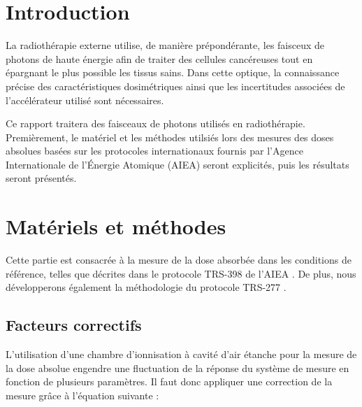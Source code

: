 \documentclass{article}
\begin{document}




\onehalfspacing

\pagestyle{fancy}
	\renewcommand\headrulewidth{0.5pt}
	\renewcommand\footrulewidth{0.5pt}
	\fancyfoot[R]{\thepage}

\tableofcontents
\clearpage
\section{Introduction}

La radiothérapie externe utilise, de manière prépondérante, les faisceux de photons de haute énergie afin de traiter des cellules cancéreuses tout en épargnant le plus possible les tissus sains. Dans cette optique, la connaissance précise des caractéristiques dosimétriques ainsi que les incertitudes associées de l'accélérateur utilisé sont nécessaires. 

Ce rapport traitera des faisceaux de photons utilisés en radiothérapie. Premièrement, le matériel et les méthodes utilsiés lors des mesures des doses absolues basées sur les protocoles internationaux fournis par l'Agence Internationale de l'Énergie Atomique (AIEA) seront explicités, puis les résultats seront présentés. 

\section{Matériels et méthodes}

Cette partie est consacrée à la mesure de la dose absorbée dans les conditions de référence, telles que décrites dans le protocole TRS-398 de l'AIEA \cite{international2001iaea}. De plus, nous développerons également la méthodologie du protocole TRS-277 \cite{internationaliaea}.

\subsection{Facteurs correctifs}

L'utilisation d'une chambre d'ionnisation à cavité d'air étanche pour la mesure de la dose absolue engendre une fluctuation de la réponse du système de mesure en fonction de plusieurs paramètres. Il faut donc appliquer une correction de la mesure grâce à l'équation suivante :
\end{document}
